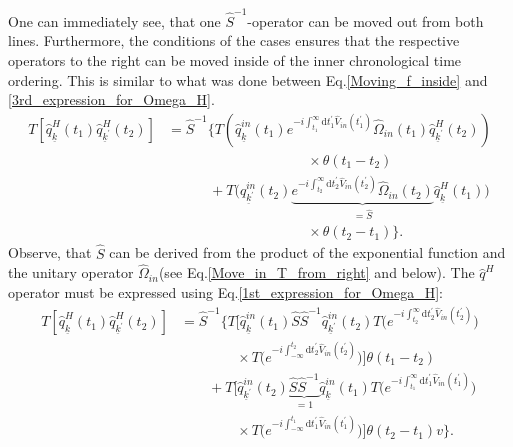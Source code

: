 \documentclass[
12pt, %
english, %
singlespacing, %
headsepline, %
]{MastersDoctoralThesis} %
\begin{document}
One can immediately see, that one $ \hat{S}^{-1} $-operator can be moved out from both lines. Furthermore, the conditions of the cases ensures that the respective operators to the right can be moved inside of the inner chronological time ordering. This is similar to what was done between Eq.\enskip\eqref{Moving_f_inside} and \eqref{3rd_expression_for_Omega_H}. 
\begin{equation}
\begin{split}
T\left[
\hat{q}^{H}_{\underline{k}}(t_1)
\hat{q}^{H}_{\underline{k}^{\prime}}(t_2)
\right]
&=
\hat{S}^{-1}
\Big\{
T\left(\hat{q}^{in}_{\underline{k}}(t_1)  e^{-i\int_{t_{1}}^{\infty}\mathrm{d}t^{\prime}_{1} \hat{V}_{in}(t_{1}^{\prime})}\hat{\Omega}_{in}(t_1) \hat{q}^{H}_{\underline{k}^{\prime}}(t_2)\right)  
\\
&\quad\quad\quad\quad\quad\quad\quad\quad\quad\quad\times
 \theta(t_1 - t_2)
		\\
    &\quad\quad\quad+
    T\Big( \hat{q}^{in}_{\underline{k}^{\prime}}(t_2)  
    \underbrace{
    e^{-i\int_{t_{2}}^{\infty}\mathrm{d}t^{\prime}_{2} \hat{V}_{in}(t_{2}^{\prime})}\hat{\Omega}_{in}(t_2)  }_{=\hat{S}}
    \hat{q}^{H}_{\underline{k}}(t_1)
    \Big)
    \\
&\quad\quad\quad\quad\quad\quad\quad\quad\quad\quad\times
        \theta(t_2 - t_1)
    \Big\}.  
    \end{split}
\end{equation}
Observe, that $ \hat{S} $ can be derived from the product of the exponential function and the unitary operator $ \hat{\Omega}_{in} $(see Eq.\enskip\eqref{Move_in_T_from_right} and below). The $ \hat{q}^{H}$ operator must be expressed using Eq.\enskip\eqref{1st_expression_for_Omega_H}:
\begin{equation}\label{finaly_express_qH}
\begin{split}
T\left[
\hat{q}^{H}_{\underline{k}}(t_1)
\hat{q}^{H}_{\underline{k}^{\prime}}(t_2)
\right]
&=\hat{S}^{-1}
\Big\{
T\Big[
	\hat{q}^{in}_{\underline{k}}(t_1)\hat{S} \hat{S}^{-1}
	\hat{q}^{in}_{\underline{k}^{\prime}}(t_2)
 T\Big( 
 		e^{-i\int_{t_{2}}^{\infty}\mathrm{d}t_{2}^{\prime} \hat{V}_{in}(t_{2}^{\prime})}
	\Big)
 	\\ 	
 	&\qquad\quad\quad\times T\Big( 
 		e^{-i\int_{-\infty}^{t_{2}}\mathrm{d}t_{2}^{\prime} \hat{V}_{in}(t_{2}^{\prime})}
 	\Big)
\Big]
				  \theta(t_1 - t_2)
		\\
&\qquad +T\Big[
	\hat{q}^{in}_{\underline{k}^{\prime}}(t_2)\underbrace{\hat{S} \hat{S}^{-1}}_{=1}
	\hat{q}^{in}_{\underline{k}}(t_1)
 	T\Big( 
 		e^{-i\int_{t_{1}}^{\infty}\mathrm{d}t_{1}^{\prime} \hat{V}_{in}(t_{1}^{\prime})}
	\Big) 	
	\\ 	
 	&\qquad\quad\quad\times 
 	T\Big( 
 		e^{-i\int_{-\infty}^{t_{1}}\mathrm{d}t_{1}^{\prime} \hat{V}_{in}(t_{1}^{\prime})}
 	\Big)
\Big]
        \theta(t_2 - t_1)v
    \Big\}  
    .
    \end{split}
\end{equation}
\end{document}
